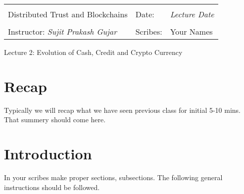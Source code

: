 \documentclass[10pt,a4paper]{article}
\begin{document}
\begin{table}[!h]
\centering
\begin{tabularx}{\textwidth}{|Xll|}
\hline
& &\\
Distributed Trust and Blockchains &  Date: & \emph{Lecture Date}\\
 & &\\
Instructor: \emph{Sujit Prakash Gujar} & Scribes: & {Your Names} \\ 
 \hline

\end{tabularx}
\end{table}

\begin{center}
\begin{LARGE}
Lecture 2: Evolution of Cash, Credit  and Crypto Currency
\end{LARGE}
\end{center}

\section{Recap}
Typically we will recap what we have seen previous class for initial 5-10 mins.
That summery should come here.

\section{Introduction}
In your scribes make proper sections, subsections.
The following general instructions should be followed.
\end{document}
